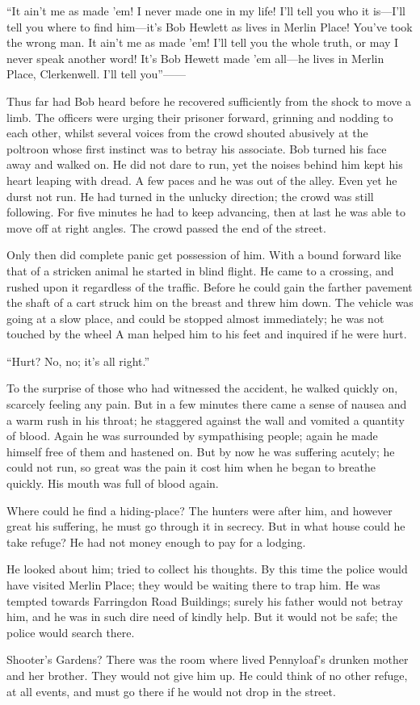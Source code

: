 ``It ain't me as made 'em! I never made one in my life! I'll tell you
who it is---I'll tell you where to find him---it's Bob Hewlett as lives
in Merlin Place! You've took the wrong man. It ain't me as made 'em!
I'll tell you the whole truth, or may I never speak another word! It's
Bob Hewett made 'em all---he lives in Merlin Place, Clerkenwell. I'll
tell you''{{------}}

Thus far had Bob heard before he recovered sufficiently from the shock
to move a limb. The officers were urging their prisoner forward,
grinning and nodding to each other, whilst several voices from the crowd
shouted abusively at the poltroon whose first instinct was to betray his
associate. Bob turned his face {\protect\hypertarget{191}{}{}}away and
walked on. He did not dare to run, yet the noises behind him kept his
heart leaping with dread. A few paces and he was out of the alley. Even
yet he durst not run. He had turned in the unlucky direction; the crowd
was still following. For five minutes he had to keep advancing, then at
last he was able to move off at right angles. The crowd passed the end
of the street.

Only then did complete panic get possession of him. With a bound forward
like that of a stricken animal he started in blind flight. He came to a
crossing, and rushed upon it regardless of the traffic. Before he could
gain the farther pavement the shaft of a cart struck him on the breast
and threw him down. The vehicle was going at a slow place, and could be
stopped almost immediately; he was not touched by the wheel A man helped
him to his feet and inquired if he were hurt.

``Hurt? No, no; it's all right.''

To the surprise of those who had witnessed the accident, he walked
quickly on, scarcely feeling any pain. But in a few minutes there came a
sense of nausea and a warm rush in his throat; he staggered against the
wall and {\protect\hypertarget{192}{}{}}vomited a quantity of blood.
Again he was surrounded by sympathising people; again he made himself
free of them and hastened on. But by now he was suffering acutely; he
could not run, so great was the pain it cost him when he began to
breathe quickly. His mouth was full of blood again.

Where could he find a hiding-place? The hunters were after him, and
however great his suffering, he must go through it in secrecy. But in
what house could he take refuge? He had not money enough to pay for a
lodging.

He looked about him; tried to collect his thoughts. By this time the
police would have visited Merlin Place; they would be waiting there to
trap him. He was tempted towards Farringdon Road Buildings; surely his
father would not betray him, and he was in such dire need of kindly
help. But it would not be safe; the police would search there.

Shooter's Gardens? There was the room where lived Pennyloaf's drunken
mother and her brother. They would not give him up. He could think of no
other refuge, at all events, and must go there if he would not drop in
the street.
